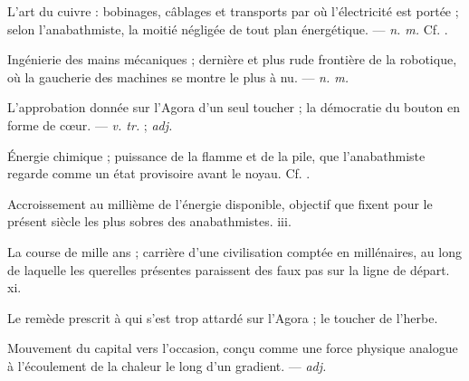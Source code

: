  L'art du cuivre : bobinages, câblages et transports par où l'électricité est portée ; selon l'anabathmiste, la moitié négligée de tout plan énergétique.  ---  \textit{n. m.} Cf. .

 Ingénierie des mains mécaniques ; dernière et plus rude frontière de la robotique, où la gaucherie des machines se montre le plus à nu. ---  \textit{n. m.}

 L'approbation donnée sur l'Agora d'un seul toucher ; la démocratie du bouton en forme de cœur. ---  \textit{v. tr.} ;  \textit{adj.}

 Énergie chimique ; puissance de la flamme et de la pile, que l'anabathmiste regarde comme un état provisoire avant le noyau. Cf. .

 Accroissement au millième de l'énergie disponible, objectif que fixent pour le présent siècle les plus sobres des anabathmistes.   iii.

 La course de mille ans ; carrière d'une civilisation comptée en millénaires, au long de laquelle les querelles présentes paraissent des faux pas sur la ligne de départ.   xi.

  Le remède prescrit à qui s'est trop attardé sur l'Agora ; le toucher de l'herbe. 

 Mouvement du capital vers l'occasion, conçu comme une force physique analogue à l'écoulement de la chaleur le long d'un gradient. ---  \textit{adj.}


